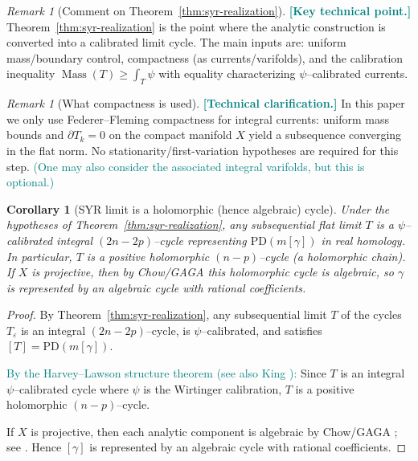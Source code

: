 \documentclass[11pt]{article}
\newcommand{\REV}[1]{\textcolor{blue}{#1}}
\newcommand{\REVMZ}[1]{\textcolor{teal}{#1}}  %
\numberwithin{equation}{section}  %
\theoremstyle{plain}
\newtheorem{corollary}[theorem]{Corollary}
\theoremstyle{definition}
\theoremstyle{remark}
\newtheorem{remark}[theorem]{Remark}
\DeclareMathOperator{\Mass}{Mass}
\begin{document}
\begin{remark}[Comment on Theorem~\ref{thm:syr-realization}]\label{rem:syr-realization-comment}
\REVMZ{\textbf{[Key technical point.]}}
Theorem~\ref{thm:syr-realization} is the point where the analytic construction is converted into a calibrated limit cycle.
The main inputs are: uniform mass/boundary control, compactness (as currents/varifolds), and the calibration inequality
$\Mass(T)\ge \int_T\psi$ with equality characterizing $\psi$--calibrated currents.
\end{remark}



\begin{remark}[What compactness is used]\label{rem:varifold-compactness-used}
\REVMZ{\textbf{[Technical clarification.]}}
In this paper we only use Federer--Fleming compactness for integral currents: uniform mass bounds and $\partial T_k=0$ on the compact manifold $X$
yield a subsequence converging in the flat norm.
No stationarity/first-variation hypotheses are required for this step.  \REVMZ{(One may also consider the associated integral varifolds, but this is optional.)}
\end{remark}




\begin{corollary}[SYR limit is a holomorphic (hence algebraic) cycle]\label{cor:syr-limit-holomorphic-chain}
Under the hypotheses of Theorem~\ref{thm:syr-realization}, any subsequential flat limit $T$ is a $\psi$--calibrated integral $(2n-2p)$--cycle representing $\mathrm{PD}(m[\gamma])$ in real homology. In particular, $T$ is a positive holomorphic $(n-p)$--cycle (a holomorphic chain).
If $X$ is projective, then by Chow/GAGA this holomorphic cycle is algebraic, so $\gamma$ is represented by an algebraic cycle with rational coefficients.
\end{corollary}

\begin{proof}
By Theorem~\ref{thm:syr-realization}, any subsequential limit $T$ of the cycles $T_\varepsilon$ is an integral $(2n-2p)$--cycle, is $\psi$--calibrated, and satisfies $[T]=\mathrm{PD}(m[\gamma])$.

\REVMZ{By the Harvey--Lawson structure theorem \cite[Thm~4.2]{HL82} (see also King \cite[Thm~4.5]{King71}):} Since $T$ is an integral $\psi$--calibrated cycle where $\psi$ is the Wirtinger calibration, $T$ is a positive holomorphic $(n-p)$--cycle.

If $X$ is projective, then each analytic component is algebraic by Chow/GAGA
; see \REV{\cite{Serre56,GH78,Hartshorne77}}. Hence $[\gamma]$ is represented by an algebraic cycle with rational coefficients.
\end{proof}
\end{document}
